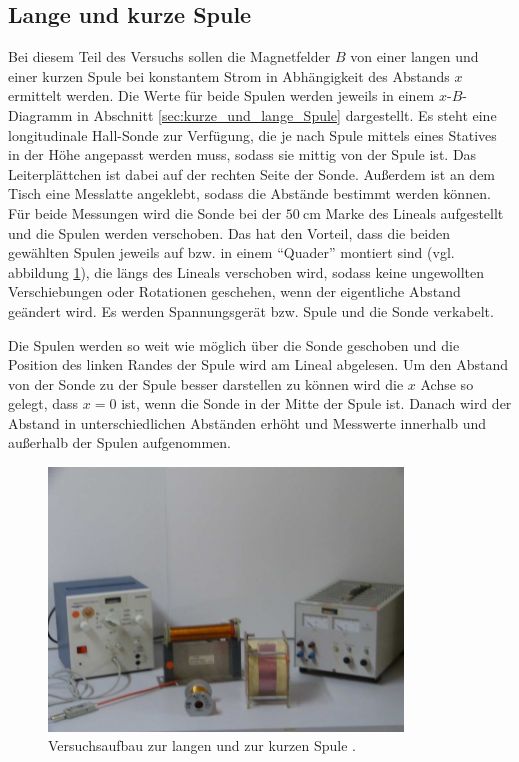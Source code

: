 \subsection{Lange und kurze Spule}
Bei diesem Teil des Versuchs sollen die Magnetfelder $B$ von einer langen und einer kurzen Spule bei konstantem Strom in Abhängigkeit 
des Abstands $x$ ermittelt werden.
Die Werte für beide Spulen werden jeweils in einem $x$-$B$-Diagramm in Abschnitt \ref{sec:kurze_und_lange_Spule} dargestellt.
Es steht eine longitudinale Hall-Sonde zur Verfügung, die je nach Spule mittels eines Statives in der Höhe angepasst werden muss, 
sodass sie mittig von der Spule ist.
Das Leiterplättchen ist dabei auf der rechten Seite der Sonde.
Außerdem ist an dem Tisch eine Messlatte angeklebt, sodass die Abstände bestimmt werden können.
Für beide Messungen wird die Sonde bei der $\qty{50}{\cm}$ Marke des Lineals aufgestellt und die Spulen werden verschoben.
Das hat den Vorteil, dass die beiden gewählten Spulen jeweils auf bzw. in einem \enquote{Quader} montiert sind (vgl. abbildung \ref{fig:lange_kurze_spule}), 
die längs des Lineals verschoben wird,  sodass keine ungewollten Verschiebungen oder Rotationen geschehen, wenn der eigentliche Abstand geändert wird.
Es werden Spannungsgerät bzw. Spule und die Sonde verkabelt.

\noindent
Die Spulen werden so weit wie möglich über die Sonde geschoben und die Position des linken Randes der Spule wird am Lineal abgelesen.
Um den Abstand von der Sonde zu der Spule besser darstellen zu können wird die $x$ Achse so gelegt, 
dass $x = 0$ ist, wenn die Sonde in der Mitte der Spule ist.
Danach wird der Abstand in unterschiedlichen Abständen erhöht und Messwerte innerhalb und außerhalb der Spulen aufgenommen.


\begin{figure}
    \centering
    \includegraphics[height = 7cm]{abbildungen/lange und kurze spule.png}
    \caption[]{Versuchsaufbau zur langen und zur kurzen Spule \cite[]{man:v308}.}
    \label{fig:lange_kurze_spule}
\end{figure}

